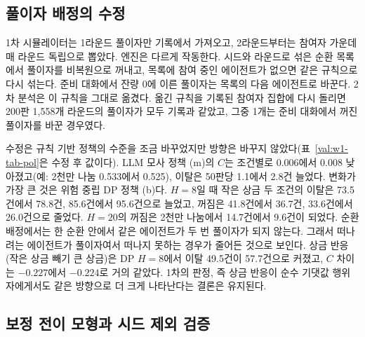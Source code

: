\subsection{풀이자 배정의 수정}\label{val:w1-solver}

1차 시뮬레이터는 1라운드 풀이자만 기록에서 가져오고, 2라운드부터는 참여자 가운데 매 라운드 독립으로 뽑았다. 엔진은 다르게 작동한다. 시드와 라운드로 섞은 순환 목록에서 풀이자를 비복원으로 꺼내고, 목록에 참여 중인 에이전트가 없으면 같은 규칙으로 다시 섞는다. 준비 대화에서 잔량 0에 이른 풀이자는 목록의 다음 에이전트로 바꾼다. 2차 분석은 이 규칙을 그대로 옮겼다. 옮긴 규칙을 기록된 참여자 집합에 다시 돌리면 200판 1,558개 라운드의 풀이자가 모두 기록과 같았고, 그중 1개는 준비 대화에서 꺼진 풀이자를 바꾼 경우였다.

수정은 규칙 기반 정책의 수준을 조금 바꾸었지만 방향은 바꾸지 않았다(표~\ref{val:w1-tab-pol}은 수정 후 값이다). LLM 모사 정책 (m)의 $C$는 조건별로 0.006에서 0.008 낮아졌고(예: 2천만 나눔 0.533에서 0.525), 이탈은 50판당 1.1에서 2.8건 늘었다. 변화가 가장 큰 것은 위험 중립 DP 정책 (b)다. $H=8$일 때 작은 상금 두 조건의 이탈은 73.5건에서 78.8건, 85.6건에서 95.6건으로 늘었고, 꺼짐은 41.8건에서 36.7건, 33.6건에서 26.0건으로 줄었다. $H=20$의 꺼짐은 2천만 나눔에서 14.7건에서 9.6건이 되었다. 순환 배정에서는 한 순환 안에서 같은 에이전트가 두 번 풀이자가 되지 않는다. 그래서 떠나려는 에이전트가 풀이자여서 떠나지 못하는 경우가 줄어든 것으로 보인다. 상금 반응(작은 상금 빼기 큰 상금)은 DP $H=8$에서 이탈 49.5건이 57.7건으로 커졌고, $C$ 차이는 $-0.227$에서 $-0.224$로 거의 같았다. 1차의 판정, 즉 상금 반응이 순수 기댓값 행위자에게서도 같은 방향으로 더 크게 나타난다는 결론은 유지된다.
\subsection{보정 전이 모형과 시드 제외 검증}\label{val:w1-calib}

